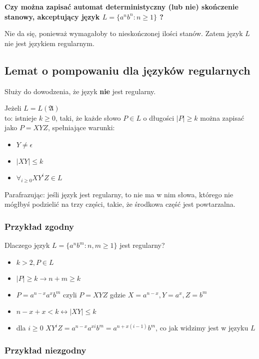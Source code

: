 \documentclass{../notatki}
\begin{document}
\par \noindent \textbf{Czy można zapisać automat deterministyczny (lub nie) skończenie stanowy, akceptujący język $L = \{a^nb^n : n \ge 1\}$ ?}

Nie da się, ponieważ wymagałoby to nieskończonej ilości stanów. Zatem język $L$ nie jest językiem regularnym.

\subsection{Lemat o pompowaniu dla języków regularnych}

Służy do dowodzenia, że język \textbf{nie} jest regularny.

Jeżeli $L = L(\mathfrak{A})$\\
\indent to: istnieje $k \ge 0$, taki, że każde słowo $P \in L$ o długości $|P| \ge k$ można zapisać jako $P = XYZ$, spełniające warunki:

\begin{itemize}
    \item $Y \ne \epsilon$
    \item $|XY| \le k$
    \item $\forall_{i \ge 0} XY^iZ \in L$
\end{itemize}

Parafrazując: jeśli język jest regularny, to nie ma w nim słowa, którego nie mógłbyś podzielić na trzy części, takie, że środkowa część jest powtarzalna.

\subsubsection{Przykład zgodny}

Dlaczego język $L = \{a^nb^m : n,m \ge 1\}$ jest regularny?

\begin{itemize}
    \item $k > 2, P \in L$
    \item $|P| \ge k \rightarrow n + m \ge k$
    \item $P = a^{n - x}a^xb^m$ czyli $P = XYZ$ gdzie $X = a^{n - x}, Y = a^x, Z = b^m$
    \item $n - x + x < k \leftrightarrow |XY| \le k$
    \item dla $i \ge 0$ $XY^iZ = a^{n - x}a^{xi}b^m = a^{n + x(i - 1)}b^m$, co jak widzimy jest w języku $L$
\end{itemize}

\subsubsection{Przykład niezgodny}
\end{document}
